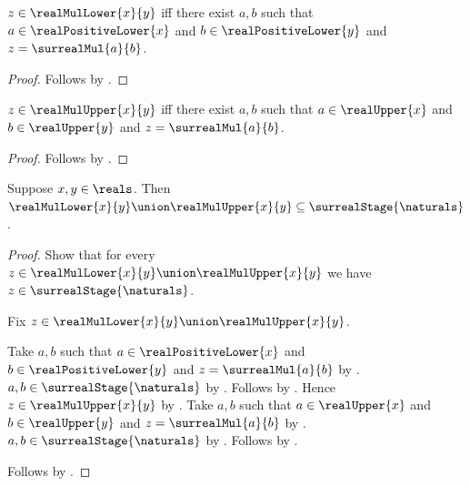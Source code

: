 \begin{proposition}\label{surreal_real_mul_lower_iff}
    $z\in\realMulLower{x}{y}$ iff there exist $a,b$ such that
        $a\in\realPositiveLower{x}$ and
        $b\in\realPositiveLower{y}$ and
        $z=\surrealMul{a}{b}$.
\end{proposition}
\begin{proof}
    Follows by
        .
\end{proof}

\begin{proposition}\label{surreal_real_mul_upper_iff}
    $z\in\realMulUpper{x}{y}$ iff there exist $a,b$ such that
        $a\in\realUpper{x}$ and $b\in\realUpper{y}$ and
        $z=\surrealMul{a}{b}$.
\end{proposition}
\begin{proof}
    Follows by
        .
\end{proof}

\begin{proposition}\label{surreal_real_mul_bounds_finite_stage}
    Suppose $x,y\in\reals$.
    Then $\realMulLower{x}{y}\union\realMulUpper{x}{y}
        \subseteq\surrealStage{\naturals}$.
\end{proposition}
\begin{proof}
    Show that for every
        $z\in\realMulLower{x}{y}\union\realMulUpper{x}{y}$ we have
        $z\in\surrealStage{\naturals}$.
    \begin{subproof}
        Fix $z\in\realMulLower{x}{y}\union\realMulUpper{x}{y}$.
        \begin{byCase}
                Take $a,b$ such that
                    $a\in\realPositiveLower{x}$ and
                    $b\in\realPositiveLower{y}$ and
                    $z=\surrealMul{a}{b}$
                    by .
                $a,b\in\surrealStage{\naturals}$
                    by .
                Follows by .
                Hence $z\in\realMulUpper{x}{y}$
                    by .
                Take $a,b$ such that
                    $a\in\realUpper{x}$ and
                    $b\in\realUpper{y}$ and
                    $z=\surrealMul{a}{b}$
                    by .
                $a,b\in\surrealStage{\naturals}$
                    by .
                Follows by .
        \end{byCase}
    \end{subproof}
    Follows by .
\end{proof}

